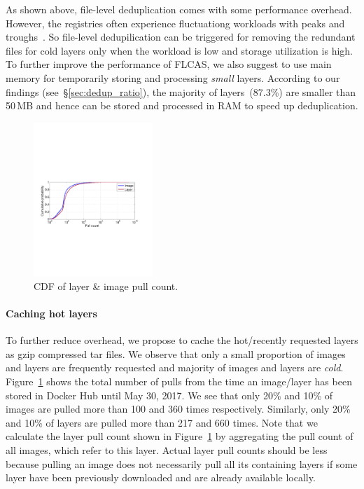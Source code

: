As shown above, file-level deduplication comes with some performance overhead.
%
However, the registries often experience fluctuationg workloads with
peaks and troughs~\cite{dockerworkload}.
%
%
So file-level dedupilication can be triggered for removing the redundant files for cold
layers only when the workload is low and storage utilization is high.
%
To further improve the performance of FLCAS, we also suggest to use main memory
for temporarily storing and processing \textit{small} layers.
%
According to our findings (see~\S\ref{sec:dedup_ratio}), the majority of layers~(87.3\%)
are smaller than 50\,MB and hence can be stored and processed in RAM to speed up
deduplication. 

\begin{figure}
	\centering
	\includegraphics[width=0.4\textwidth]{graphs/pull-cnt.pdf}
	\caption{CDF of layer \& image pull count.
	}
	\label{fig:pull-cnt}
\end{figure}

\paragraph{Caching hot layers}

To further reduce overhead, we propose to cache the hot/recently requested layers as
gzip compressed tar files.
%
We observe that only a small proportion of images
and layers are frequently requested and majority of images and layers are
\textit{cold}.
%
Figure~\ref{fig:pull-cnt} shows the total
number of pulls from the time an image/layer has been stored in Docker Hub until
May 30, 2017.
%
We see that only 20\% and 10\% of images are pulled more than 100 and
360 times respectively.
%
Similarly, only 20\% and 10\% of layers are pulled
more than 217 and 660 times.
%
Note that we calculate the layer pull count shown in
Figure~\ref{fig:pull-cnt} by aggregating the pull count of
all images, which refer to this layer.
%
%
Actual layer pull counts should be less because pulling an image does not
necessarily pull all its containing layers if some layer have been previously
downloaded and are already available locally.
%

